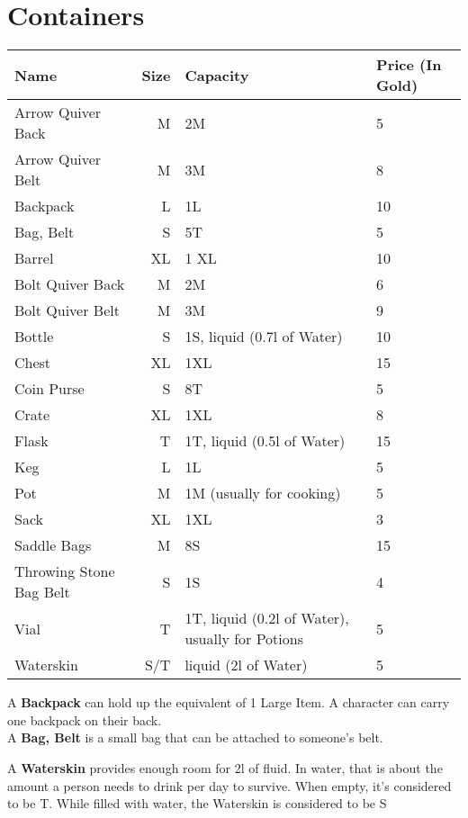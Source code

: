 \section{Containers}\label{sec:containers}
\begin{longtable}{l | r | p{4.5cm} | p{1.5cm}}
	Name & Size & Capacity & Price (In Gold)\\ \hline
	Arrow Quiver Back & M & 2M & 5 \\
	Arrow Quiver Belt & M & 3M & 8 \\
	Backpack & L & 1L & 10 \\
	Bag, Belt & S & 5T & 5 \\
	Barrel & XL & 1 XL & 10 \\
	Bolt Quiver Back & M & 2M & 6 \\
	Bolt Quiver Belt & M & 3M & 9 \\
	Bottle & S & 1S, liquid (0.7l of Water) & 10 \\
	Chest & XL & 1XL & 15 \\
	Coin Purse & S & 8T & 5 \\
	Crate & XL & 1XL & 8 \\
	Flask & T & 1T, liquid (0.5l of Water) & 15 \\
	Keg & L & 1L & 5 \\
	Pot & M & 1M (usually for cooking) & 5 \\
	Sack & XL & 1XL & 3 \\
	Saddle Bags & M & 8S & 15 \\
	Throwing Stone Bag Belt & S & 1S & 4 \\
	Vial & T & 1T, liquid (0.2l of Water), usually for Potions & 5 \\
	Waterskin & S/T & liquid (2l of Water) & 5 \\
\end{longtable}

A \textbf{Backpack} can hold up the equivalent of 1 Large Item.
A character can carry one backpack on their back.\\

A \textbf{Bag, Belt} is a small bag that can be attached to someone's belt.

A \textbf{Waterskin} provides enough room for 2l of fluid.
In water, that is about the amount a person needs to drink per day to survive.
When empty, it's considered to be T.
While filled with water, the Waterskin is considered to be S\\